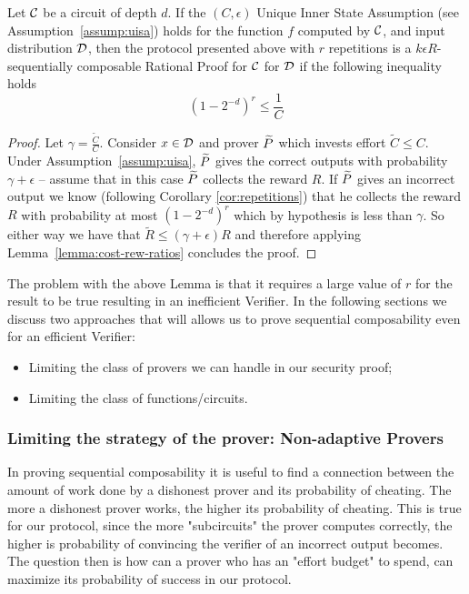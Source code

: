 \begin{mylemma}
	Let $\cal{C}$ be a circuit of depth $d$. If the $(C,\epsilon)$ Unique Inner State Assumption (see Assumption~\ref{assump:uisa}) holds for the function $f$ computed by $\cal C$, and input distribution $\cal D$, then the protocol presented above with $r$ repetitions is a $k\epsilon R$-sequentially composable Rational Proof for $\cal{C}$ for $\cal D$ if the following inequality holds 
	$$ (1-2^{-d})^r \leq \frac{1}{C} $$
\end{mylemma}
\begin{proof}
	Let $\gamma=\frac{\tilde{C}}{C}$. 
Consider $x \in \cal D$ and prover $\widetilde{P}$ which invests effort $\tilde{C}\leq C$. Under Assumption~\ref{assump:uisa}, $\widetilde{P}$ gives the correct outputs
with probability $\gamma+\epsilon$ -- assume that in this case $\widetilde{P}$ collects the reward $R$. If $\widetilde{P}$ gives an incorrect output we know (following Corollary \ref{cor:repetitions}) that he collects the reward 
$R$ with probability at most $(1-2^{-d})^r$ which by hypothesis is less than $\gamma$. So either way we have that $\tilde{R} \leq (\gamma + \epsilon)R$ 
and therefore applying Lemma~\ref{lemma:cost-rew-ratios} concludes the proof.
\end{proof}
The problem with the above Lemma is that it requires a large value of $r$ for the result to be true resulting in an inefficient Verifier. In the following
sections we discuss two approaches that will allows us to prove sequential composability even for an efficient Verifier:
\begin{itemize}
\item Limiting the class of provers we can handle in our security proof;
\item Limiting the class of functions/circuits.
\end{itemize}


\subsubsection{Limiting the strategy of the prover: Non-adaptive Provers}

\smallskip
\noindent
In proving sequential composability it is useful to find a connection between the amount of work done by a dishonest prover and its probability of cheating. The more a dishonest prover works, the higher its probability of cheating. This is true for our protocol, since the more "subcircuits" the prover computes correctly, the higher is probability of convincing the verifier of an incorrect output becomes. The question then is how can a prover who has an "effort budget" to spend, can maximize its probability of success in our protocol. 

